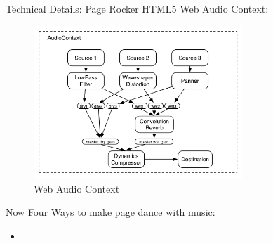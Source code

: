 \documentclass{beamer}
\begin{document}
\begin{frame}{Technical Details: Page Rocker}
HTML5 Web Audio Context:
\begin{center}
    \begin{figure}
        \includegraphics[width=0.7\textwidth]{./images/audiocontext.png}
        \caption{Web Audio Context}
    \end{figure}
\end{center}
\end{frame}

\begin{frame}
Now Four Ways to make page dance with music:
\begin{itemize}
    \item 
\end{itemize}
\end{frame}



\end{document}

